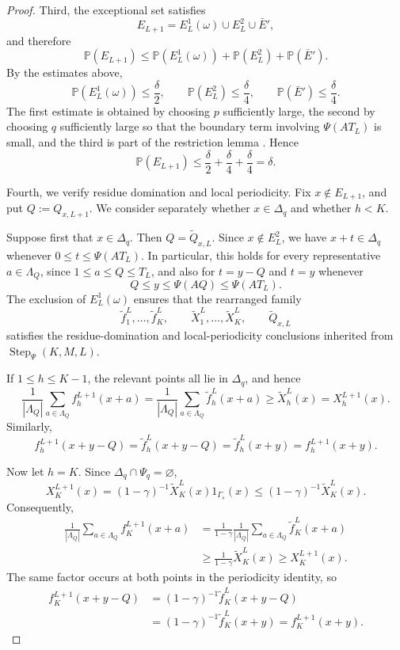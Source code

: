 \documentclass[12pt,leqno]{amsart}
\numberwithin{equation}{section}
\numberwithin{counter2}{section}
\theoremstyle{definition}
\theoremstyle{plain}
\begin{document}
\begin{proof}
\bigskip

Third, the exceptional set satisfies
\[
E_{L+1}
=
E_L^1(\omega)\cup E_L^2\cup \bar E',
\]
and therefore
\[
\mathbb P(E_{L+1})
\leq
\mathbb P(E_L^1(\omega))
+
\mathbb P(E_L^2)
+
\mathbb P(\bar E').
\]
By the estimates above,
\[
\mathbb P(E_L^1(\omega))\leq \frac{\delta}{2},
\qquad
\mathbb P(E_L^2)\leq \frac{\delta}{4},
\qquad
\mathbb P(\bar E')\leq \frac{\delta}{4}.
\]
The first estimate is obtained by choosing \(p\) sufficiently large, the second
by choosing \(q\) sufficiently large so that the boundary term involving
\(\Psi(AT_L)\) is small, and the third is part of the restriction lemma
\cite[Lemma~7.1]{L9}. Hence
\[
\mathbb P(E_{L+1})\leq
\frac{\delta}{2}
+
\frac{\delta}{4}
+
\frac{\delta}{4}
=
\delta.
\]

\bigskip

Fourth, we verify residue domination and local periodicity. Fix
\(x\notin E_{L+1}\), and put \(Q:=Q_{x,L+1}\). We consider separately
whether \(x\in\Delta_q\) and whether \(h<K\).

\medskip

Suppose first that \(x\in\Delta_q\). Then
\(Q=\widetilde Q_{x,L}\). Since \(x\notin E_L^2\), we have $x+t\in\Delta_q$ whenever $0\leq t\leq\Psi(AT_L).$
In particular, this holds for every representative
\(a\in\Lambda_Q\), since \(1\leq a\leq Q\leq T_L\), and also for
\(t=y-Q\) and \(t=y\) whenever
\[
Q\leq y\leq\Psi(AQ)\leq\Psi(AT_L).
\]
The exclusion of \(E_L^1(\omega)\) ensures that the rearranged family
\[
\widetilde f_1^L,\dots,\widetilde f_K^L,\qquad
\widetilde X_1^L,\dots,\widetilde X_K^L,\qquad
\widetilde Q_{x,L}
\]
satisfies the residue-domination and local-periodicity conclusions inherited
from \(\operatorname{Step}_{\Psi}(K,M,L)\).

If \(1\leq h\leq K-1\), the relevant points all lie in \(\Delta_q\), and hence
\[
\frac1{|\Lambda_Q|}
\sum_{a\in\Lambda_Q}f_h^{L+1}(x+a)
=
\frac1{|\Lambda_Q|}
\sum_{a\in\Lambda_Q}\widetilde f_h^L(x+a)
\geq
\widetilde X_h^L(x)
=
X_h^{L+1}(x).
\]
Similarly,
\[
f_h^{L+1}(x+y-Q)
=
\widetilde f_h^L(x+y-Q)
=
\widetilde f_h^L(x+y)
=
f_h^{L+1}(x+y).
\]

Now let \(h=K\). Since \(\Delta_q\cap\Psi_q=\varnothing\),
\[
X_K^{L+1}(x)
=
(1-\gamma)^{-1}\widetilde X_K^L(x)1_{\Gamma_s}(x)
\leq
(1-\gamma)^{-1}\widetilde X_K^L(x).
\]
Consequently,
\[
\begin{aligned}
\frac1{|\Lambda_Q|}
\sum_{a\in\Lambda_Q}f_K^{L+1}(x+a)
&=
\frac{1}{1-\gamma}
\frac1{|\Lambda_Q|}
\sum_{a\in\Lambda_Q}\widetilde f_K^L(x+a)\\
&\geq
\frac{1}{1-\gamma}\widetilde X_K^L(x)
\geq X_K^{L+1}(x).
\end{aligned}
\]
The same factor occurs at both points in the periodicity identity, so
\[
\begin{aligned}
f_K^{L+1}(x+y-Q)
&=(1-\gamma)^{-1}\widetilde f_K^L(x+y-Q)\\
&=(1-\gamma)^{-1}\widetilde f_K^L(x+y)
=f_K^{L+1}(x+y).
\end{aligned}
\]


\end{proof}
\end{document}

